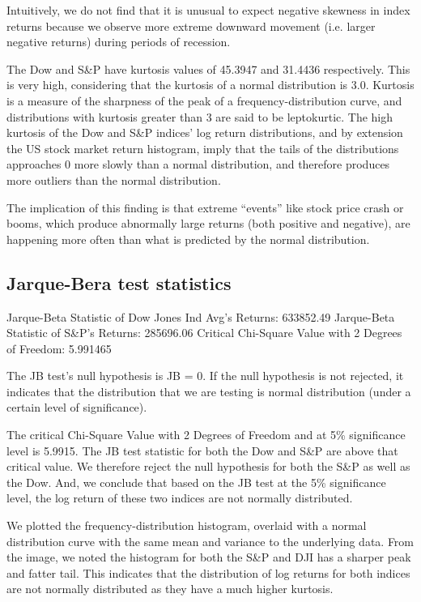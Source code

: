 \documentclass[a4paper]{article}
\begin{document}
Intuitively, we do not find that it is unusual to expect negative skewness in index returns because we observe more extreme downward movement (i.e. larger negative returns) during periods of recession.

The Dow and S\&P have kurtosis values of 45.3947 and 31.4436 respectively. This is very high, considering that the kurtosis of a normal distribution is 3.0. Kurtosis is a measure of the sharpness of the peak of a frequency-distribution curve, and distributions with kurtosis greater than 3 are said to be leptokurtic. The high kurtosis of the Dow and S\&P indices' log return distributions, and by extension the US stock market return histogram, imply that the tails of the distributions approaches 0 more slowly than a normal distribution, and therefore produces more outliers than the normal distribution. 

The implication of this finding is that extreme “events” like stock price crash or booms, which produce abnormally large returns (both positive and negative), are happening more often than what is predicted by the normal distribution.


\subsection{Jarque-Bera test statistics}
\begin{flushleft}
Jarque-Beta Statistic of Dow Jones Ind Avg's Returns: 633852.49\linebreak
Jarque-Beta Statistic of S\&P's Returns: 285696.06\linebreak
Critical Chi-Square Value with 2 Degrees of Freedom: 5.991465\linebreak
\end{flushleft}

The JB test’s null hypothesis is JB = 0. If the null hypothesis is not rejected, it indicates that the distribution that we are testing is normal distribution (under a certain level of significance).  

The critical Chi-Square Value with 2 Degrees of Freedom and at 5\% significance level is 5.9915. The JB test statistic for both the Dow and S\&P are above that critical value. We therefore reject the null hypothesis for both the S\&P as well as the Dow. And, we conclude that based on the JB test at the 5\% significance level, the log return of these two indices are not normally distributed.

We plotted the frequency-distribution histogram, overlaid with a normal distribution curve with the same mean and variance to the underlying data. From the image, we noted the histogram for both the S\&P and DJI has a sharper peak and fatter tail. This indicates that the distribution of log returns for both indices are not normally distributed as they have a much higher kurtosis.
\end{document}
